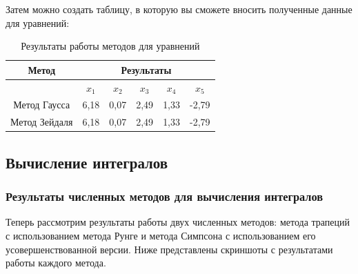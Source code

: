 \documentclass[12pt]{article}
\begin{document}
Затем можно создать таблицу, в которую вы сможете вносить полученные данные для уравнений:

\begin{table}[ht]
\centering
\begin{tabular}{|c|c|c|c|c|c|}
\hline
\textbf{Метод} & \multicolumn{5}{c|}{\textbf{Результаты}} \\
\hline
& $x_1$ & $x_2$ & $x_3$ & $x_4$ & $x_5$ \\
\hline
Метод Гаусса & 6,18 & 0,07 &2,49&1,33 &-2,79 \\
\hline
Метод Зейдаля& 6,18 & 0,07 &2,49&1,33 &-2,79  \\
\hline
\end{tabular}
\caption{Результаты работы методов для уравнений}
\end{table}
\subsection{Вычисление интегралов}

\subsubsection{Результаты численных методов для вычисления интегралов}

Теперь рассмотрим результаты работы двух численных методов: метода трапеций с использованием метода Рунге и метода Симпсона с использованием его усовершенствованной версии. Ниже представлены скриншоты с результатами работы каждого метода.
\end{document}
